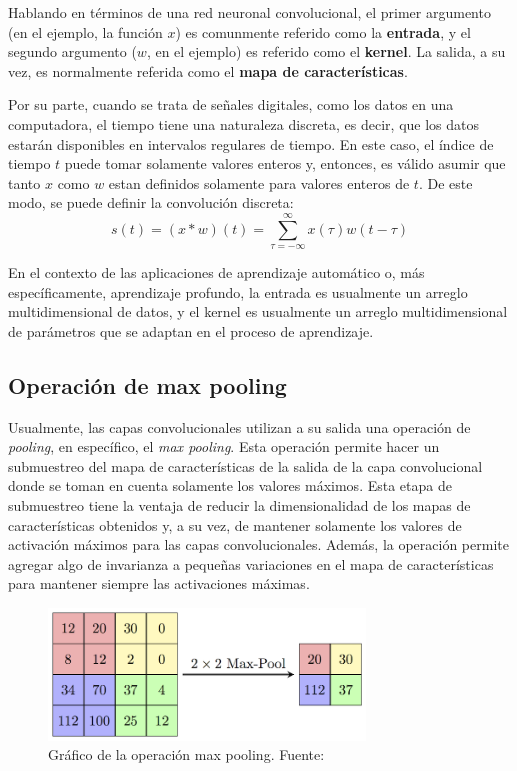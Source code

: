         Hablando en términos de una red neuronal convolucional, el primer argumento (en el ejemplo, la función $x$) 
        es comunmente referido como la \textbf{entrada}, y el segundo argumento ($w$, en el ejemplo) es referido 
        como el \textbf{kernel}. La salida, a su vez, es normalmente referida como el \textbf{mapa de características}.
        
        Por su parte, cuando se trata de señales digitales, como los datos en una computadora, el tiempo tiene una 
        naturaleza discreta, es decir, que los datos estarán disponibles en intervalos regulares de tiempo. En este 
        caso, el índice de tiempo $t$ puede tomar solamente valores enteros y, entonces, es válido asumir 
        que tanto $x$ como $w$ estan definidos solamente para valores enteros de $t$. De este modo, 
        se puede definir la convolución discreta:
        \begin{equation}
            s(t) = (x \ast w)(t) = \sum_{\tau=-\infty}^{\infty}x(\tau)w(t-\tau)
        \end{equation}

        En el contexto de las aplicaciones de aprendizaje automático o, más específicamente, aprendizaje profundo,
        la entrada es usualmente un arreglo multidimensional de datos, y el kernel es usualmente un arreglo 
        multidimensional de parámetros que se adaptan en el proceso de aprendizaje. 

        \subsection{Operación de max pooling} \label{sec:maxpool}
        Usualmente, las capas convolucionales utilizan a su salida una operación de \textit{pooling}, en específico, 
        el \textit{max pooling}. Esta operación permite hacer un submuestreo del mapa de características de la salida 
        de la capa convolucional donde se toman en cuenta solamente los valores máximos. Esta etapa de submuestreo 
        tiene la ventaja de reducir la dimensionalidad de los mapas de características obtenidos y, a su vez, de 
        mantener solamente los valores de activación máximos para las capas convolucionales. Además, la operación 
        permite agregar algo de invarianza a pequeñas variaciones en el mapa de características para mantener 
        siempre las activaciones máximas. 

        \begin{figure}[!h] 
            \centering
            \includegraphics[width=0.75\textwidth]{img/maxpool}
            \caption[Gráfico de la operación max pooling]{Gráfico de la operación max pooling. Fuente: \cite{wang_2016} }
            \label{fig:maxpool}
        \end{figure}

